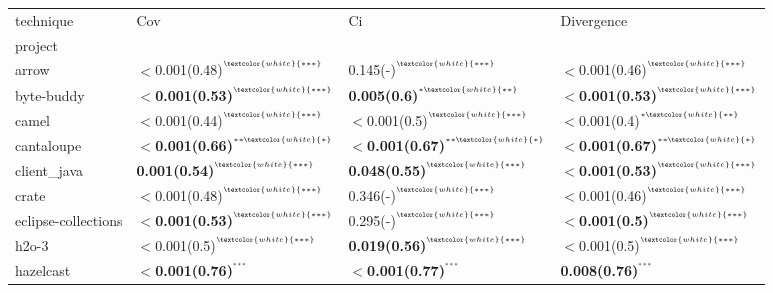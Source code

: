 \begin{tabular}{llll}
\toprule
technique &                                                           Cov &                                                            Ci &                                                    Divergence \\
project             &                                                               &                                                               &                                                               \\
\midrule
arrow               &  $<$0.001(0.48)\tiny{$^{^{\textcolor{white}{***}}}$} &  0.145(-)\tiny{$^{^{\textcolor{white}{***}}}$} &  $<$0.001(0.46)\tiny{$^{^{\textcolor{white}{***}}}$} \\
byte-buddy          &  \textbf{$<$0.001(0.53)}\tiny{$^{^{\textcolor{white}{***}}}$} &  \textbf{0.005(0.6)}\tiny{$^{^{*\textcolor{white}{**}}}$} &  \textbf{$<$0.001(0.53)}\tiny{$^{^{\textcolor{white}{***}}}$} \\
camel               &  $<$0.001(0.44)\tiny{$^{^{\textcolor{white}{***}}}$} &  $<$0.001(0.5)\tiny{$^{^{\textcolor{white}{***}}}$} &  $<$0.001(0.4)\tiny{$^{^{*\textcolor{white}{**}}}$} \\
cantaloupe          &  \textbf{$<$0.001(0.66)}\tiny{$^{^{**\textcolor{white}{*}}}$} &  \textbf{$<$0.001(0.67)}\tiny{$^{^{**\textcolor{white}{*}}}$} &  \textbf{$<$0.001(0.67)}\tiny{$^{^{**\textcolor{white}{*}}}$} \\
client_java         &  \textbf{0.001(0.54)}\tiny{$^{^{\textcolor{white}{***}}}$} &  \textbf{0.048(0.55)}\tiny{$^{^{\textcolor{white}{***}}}$} &  \textbf{$<$0.001(0.53)}\tiny{$^{^{\textcolor{white}{***}}}$} \\
crate               &  $<$0.001(0.48)\tiny{$^{^{\textcolor{white}{***}}}$} &  0.346(-)\tiny{$^{^{\textcolor{white}{***}}}$} &  $<$0.001(0.46)\tiny{$^{^{\textcolor{white}{***}}}$} \\
eclipse-collections &  \textbf{$<$0.001(0.53)}\tiny{$^{^{\textcolor{white}{***}}}$} &  0.295(-)\tiny{$^{^{\textcolor{white}{***}}}$} &  \textbf{$<$0.001(0.5)}\tiny{$^{^{\textcolor{white}{***}}}$} \\
h2o-3               &  $<$0.001(0.5)\tiny{$^{^{\textcolor{white}{***}}}$} &  \textbf{0.019(0.56)}\tiny{$^{^{\textcolor{white}{***}}}$} &  $<$0.001(0.5)\tiny{$^{^{\textcolor{white}{***}}}$} \\
hazelcast           &  \textbf{$<$0.001(0.76)}\tiny{$^{^{***}}$} &  \textbf{$<$0.001(0.77)}\tiny{$^{^{***}}$} &  \textbf{0.008(0.76)}\tiny{$^{^{***}}$} \\

\end{tabular}
